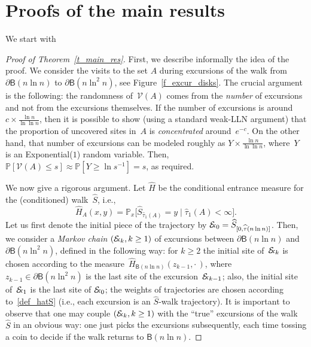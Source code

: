 \documentclass[AHL,Unicode,longabstracts]{cedram}
\newcommand{\1}[1]{{\mathbf 1}{\{#1\}}}
\newcommand{\V}{{\mathcal V}}
\newcommand{\Ex}{{\mathcal{E}\!\!\text{\footnotesize{\textsl{x}}}}}
\newcommand{\s}{{\widehat S}}
\newcommand{\8}{{\infty}}
\newcommand{\IP}{{\mathbb P}}
\newcommand{\hH}{{\widehat H}}
\newcommand{\htau}{\widehat{\tau}}
\newcommand{\B}{{\mathsf B}}
\begin{document}
\section{Proofs of the main results}\label{s_proofs}

We start with

\begin{proof}[Proof of Theorem~\ref{t_main_res}]
First, we describe informally the idea of the proof. We consider the visits to the set $A$ during excursions of the walk from $\partial\B(n\ln n)$ to $\partial\B(n\ln^2 n)$, see Figure~\ref{f_excur_disks}. The crucial argument is the following: the randomness of~$\V(A)$ comes from the \emph{number} of excursions and not from the excursions themselves. If the number of excursions is around $c\times\frac{\ln n}{\ln\ln n}$, then it is possible to show (using a standard weak-LLN argument) that the proportion of uncovered sites in~$A$ is \emph{concentrated} around~$e^{-c}$. On the other hand, that number of excursions can be modeled roughly as $Y \times\frac{\ln n}{\ln\ln n}$, where~$Y$ is an Exponential($1$) random variable. Then, $\IP[\V(A)\leq s]\approx \IP[Y\geq \ln s^{-1}]=s$, as required.

We now give a rigorous argument. Let $\hH$ be the conditional entrance measure for the (conditioned) walk~$\s$, i.e.,
\begin{equation}\label{df_hatH}
\hH_A(x,y) = \IP_x\big[\s_{\htau_1(A)}=y \mid \htau_1(A)<\infty\big].
\end{equation}
Let us first denote the initial piece of the trajectory by $\Ex_0=\s_{[0,\htau(n\ln n)]}$. Then, we consider a \emph{Markov chain} $(\Ex_k,k\geq 1)$ of excursions between $\partial\B(n\ln n)$ and $\partial\B(n\ln^2 n)$, defined in the following way: for $k\geq 2$ the initial site of~$\Ex_k$ is chosen according to the measure~$\hH_{\B(n\ln n)}(z_{k-1},\cdot\,)$, where $z_{k-1}\in\partial\B(n\ln^2 n)$ is the last site of the excursion~$\Ex_{k-1}$; also, the initial site of~$\Ex_1$ is the last site of $\Ex_0$; the weights of trajectories are chosen according to~\eqref{def_hatS} (i.e., each excursion is an $\s$-walk trajectory). It is important to observe that one may couple $(\Ex_k,k\geq 1)$ with the ``true'' excursions of the walk~$\s$ in an obvious way: one just picks the excursions subsequently, each time tossing a coin to decide if the walk returns to $\B(n\ln n)$.


\end{proof}
\end{document}
